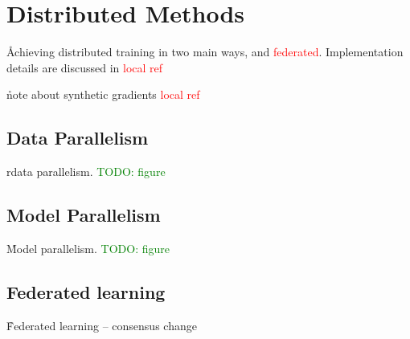 \chapter{Distributed Methods}

\r{Achieving distributed training in two main ways, and \textcolor{red}{federated}. Implementation details are discussed in \textcolor{red}{local ref}}

\r{note about synthetic gradients \textcolor{red}{local ref}}


\section{Data Parallelism}

r{data parallelism. \textcolor{green}{TODO: figure}}

\section{Model Parallelism}

\r{Model parallelism. \textcolor{green}{TODO: figure}}

\section{Federated learning}

\r{Federated learning -- consensus change}


